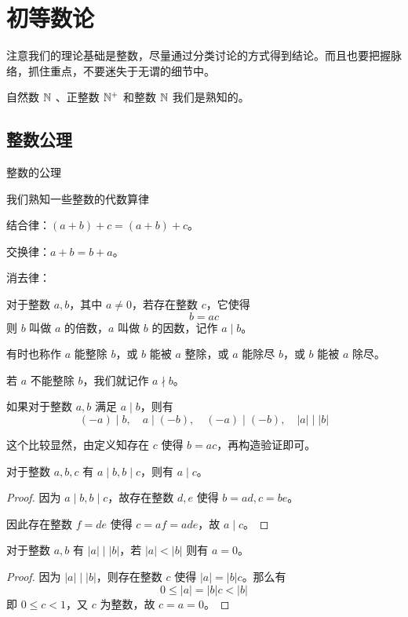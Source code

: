 \chapter{初等数论}

注意我们的理论基础是整数，尽量通过分类讨论的方式得到结论。而且也要把握脉络，抓住重点，不要迷失于无谓的细节中。

自然数 $\mathbb{N}$ 、正整数 $\mathbb{N}^+$ 和整数 $\mathbb{N}$ 我们是熟知的。

\section{整数公理}

整数的公理

我们熟知一些整数的代数算律

结合律：$(a+b)+c = (a+b)+c$。

交换律：$a+b = b+a$。

消去律：

\begin{definition}
	对于整数 $a,b$，其中 $a\ne 0$，若存在整数 $c$，它使得
	$$b=ac$$
	则 $b$ 叫做 $a$ 的倍数，$a$ 叫做 $b$ 的因数，记作 $a \mid b$。
\end{definition}

有时也称作 $a$ 能整除 $b$，或 $b$ 能被 $a$ 整除，或 $a$ 能除尽 $b$，或 $b$ 能被 $a$ 除尽。

若 $a$ 不能整除 $b$，我们就记作 $a \nmid b$。

\begin{lemma}
	如果对于整数 $a,b$ 满足 $a \mid b$，则有
	$$(-a) \mid b,\quad a \mid (-b),\quad (-a) \mid (-b),\quad |a| \mid |b|$$
\end{lemma}

这个比较显然，由定义知存在 $c$ 使得 $b=ac$，再构造验证即可。

\begin{lemma}
	对于整数 $a,b,c$ 有 $a \mid b,b \mid c$，则有 $a \mid c$。
\end{lemma}

\begin{proof}
	因为 $a \mid b,b \mid c$，故存在整数 $d,e$ 使得 $b=ad,c=be$。

	因此存在整数 $f=de$ 使得 $c=af=ade$，故 $a \mid c$。
\end{proof}

\begin{lemma}
	对于整数 $a,b$ 有 $|a| \mid |b|$，若 $|a|<|b|$ 则有 $a=0$。
\end{lemma}

\begin{proof}
	因为 $|a| \mid |b|$，则存在整数 $c$ 使得 $|a|=|b|c$。那么有
	$$0 \leqslant |a|=|b|c<|b|$$
	即 $0\leqslant c<1$，又 $c$ 为整数，故 $c=a=0$。
\end{proof}

